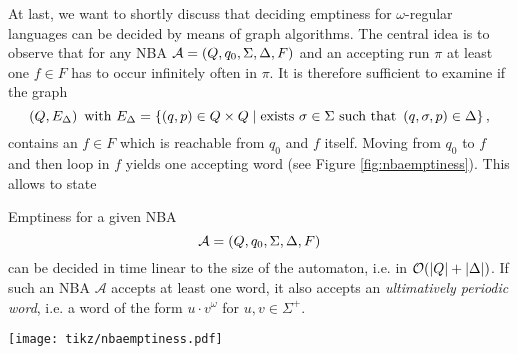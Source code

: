 At last, we want to shortly discuss that deciding emptiness for
$\omega$-regular languages can be decided by means of graph algorithms. The
central idea is to observe that for any \ac{NBA}
$\mathcal{A} = \left(Q, q_{0}, \Sigma, \Delta, F\right)$ and an accepting run $\pi$
at least one $f\in F$ has to occur infinitely often in $\pi$. It is therefore
sufficient to examine if the graph
\begin{equation*}
  \left(Q, E_{\Delta}\right)\text{ with }
  E_{\Delta} = \left\{
    \left(q, p\right)\in Q\times Q\mid\text{exists }\sigma\in\Sigma
      \text{ such that }\left(q,\sigma,p\right)\in\Delta
  \right\},
\end{equation*}
contains an $f\in F$ which is reachable from $q_{0}$ and $f$ itself. Moving
from $q_{0}$ to $f$ and then loop in $f$ yields one accepting word (see Figure
\ref{fig:nbaemptiness}). This allows to state
\begin{theorem}
  \cite{DecMethRestArith,EmptinessNBA}
  Emptiness for a given \ac{NBA}
  \begin{equation*}
    \mathcal{A} = \left(Q, q_{0}, \Sigma, \Delta, F\right)
  \end{equation*}
  can be decided in time linear to the size of the automaton, i.e. in
  $\mathcal{O}(\left\vert{Q}\right\vert+\left\vert{\Delta}\right\vert)$. If such an \ac{NBA} $\mathcal{A}$
  accepts at least one word, it also accepts an \emph{ultimatively periodic
  word}, i.e. a word of the form $u\cdot v^{\omega}$ for $u, v\in\Sigma^{+}$.
  \label{thm:nbaemptiness}
\end{theorem}

\begin{drawing}
    \caption{Illustration of an accepting run of an \acp{NBA}.}
    \label{fig:nbaemptiness}
    \begin{center}
      \texttt{[image: tikz/nbaemptiness.pdf]}
    \end{center}
\end{drawing}%
